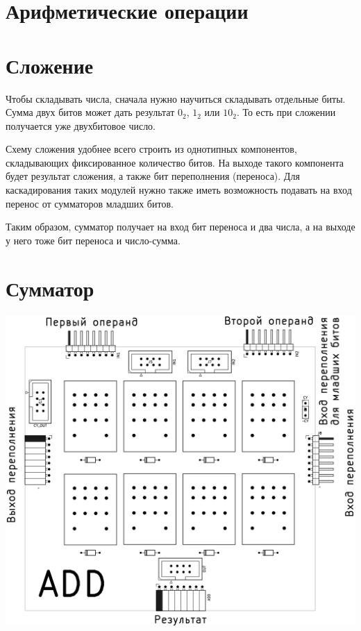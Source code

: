 \section{Арифметические операции}

\section{Сложение}

Чтобы складывать числа, сначала нужно научиться складывать отдельные биты.
Сумма двух битов может дать результат $0_2$, $1_2$ или $10_2$.
То есть при сложении получается уже двухбитовое число.

Схему сложения удобнее всего строить из однотипных компонентов, складывающих
фиксированное количество битов. На выходе такого компонента будет результат
сложения, а также бит переполнения (переноса). Для каскадирования
таких модулей нужно также иметь возможность подавать на вход перенос от
сумматоров младших битов.

Таким образом, сумматор получает на вход бит переноса и два числа, а на выходе
у него тоже бит переноса и число-сумма.


\section{Сумматор}

\begin{center}
\includegraphics{boards/adder.png}
\end{center}

